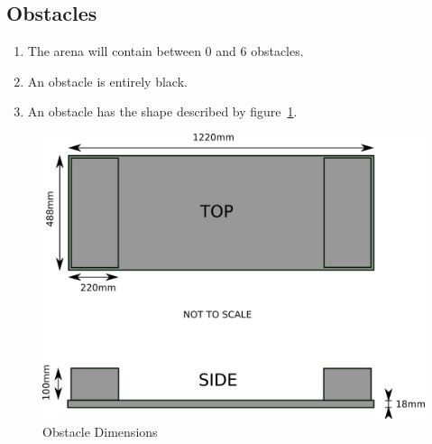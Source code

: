 \subsection{Obstacles}
\begin{enumerate}
\item The arena will contain between 0 and 6 obstacles.
\item An obstacle is entirely black.
\item An obstacle has the shape described by figure~\ref{fig:obstacle}.
\end{enumerate}

\begin{figure}
\begin{center}
\includegraphics[keepaspectratio, scale =1]{./images/obstacle.png}
\caption{\label{fig:obstacle}Obstacle Dimensions}
\end{center}
\end{figure}

